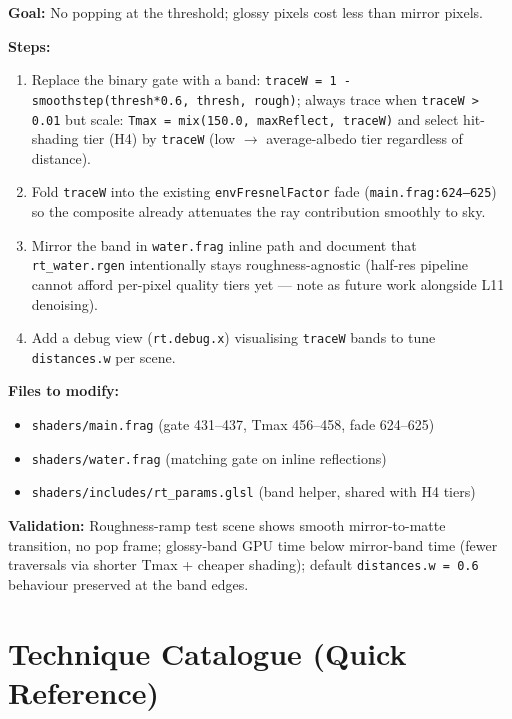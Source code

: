 \documentclass[11pt,a4paper]{article}
\begin{document}
\begin{tcolorbox}[promptbox={Prompt: Roughness-Graded Reflection Quality Instead of Binary Gate}]
\textbf{Goal:} No popping at the threshold; glossy pixels cost less than mirror pixels.

\textbf{Steps:}
\begin{enumerate}
    \item Replace the binary gate with a band: \texttt{traceW = 1 - smoothstep(thresh*0.6, thresh, rough)}; always trace when \texttt{traceW \textgreater{} 0.01} but scale: \texttt{Tmax = mix(150.0, maxReflect, traceW)} and select hit-shading tier (H4) by \texttt{traceW} (low $\rightarrow$ average-albedo tier regardless of distance).
    \item Fold \texttt{traceW} into the existing \texttt{envFresnelFactor} fade (\texttt{main.frag:624--625}) so the composite already attenuates the ray contribution smoothly to sky.
    \item Mirror the band in \texttt{water.frag} inline path and document that \texttt{rt\_water.rgen} intentionally stays roughness-agnostic (half-res pipeline cannot afford per-pixel quality tiers yet --- note as future work alongside L11 denoising).
    \item Add a debug view (\texttt{rt.debug.x}) visualising \texttt{traceW} bands to tune \texttt{distances.w} per scene.
\end{enumerate}

\textbf{Files to modify:}
\begin{itemize}
    \item \texttt{shaders/main.frag} (gate 431--437, Tmax 456--458, fade 624--625)
    \item \texttt{shaders/water.frag} (matching gate on inline reflections)
    \item \texttt{shaders/includes/rt\_params.glsl} (band helper, shared with H4 tiers)
\end{itemize}

\textbf{Validation:} Roughness-ramp test scene shows smooth mirror-to-matte transition, no pop frame; glossy-band GPU time below mirror-band time (fewer traversals via shorter Tmax + cheaper shading); default \texttt{distances.w = 0.6} behaviour preserved at the band edges.
\end{tcolorbox}

\section{Technique Catalogue (Quick Reference)}
\end{document}
